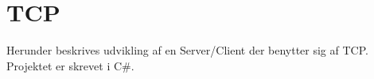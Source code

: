 \chapter{TCP}
Herunder beskrives udvikling af en Server/Client der benytter sig af TCP. Projektet er skrevet i C\#.